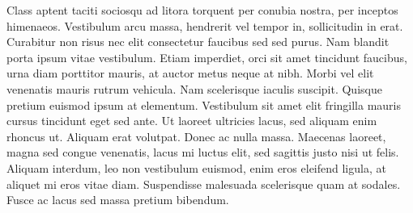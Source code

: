 Class aptent taciti sociosqu ad litora torquent per conubia nostra, per inceptos himenaeos. Vestibulum arcu massa, hendrerit vel tempor in, sollicitudin in erat. Curabitur non risus nec elit consectetur faucibus sed sed purus. Nam blandit porta ipsum vitae vestibulum. Etiam imperdiet, orci sit amet tincidunt faucibus, urna diam porttitor mauris, at auctor metus neque at nibh. Morbi vel elit venenatis mauris rutrum vehicula. Nam scelerisque iaculis suscipit. Quisque pretium euismod ipsum at elementum. Vestibulum sit amet elit fringilla mauris cursus tincidunt eget sed ante. Ut laoreet ultricies lacus, sed aliquam enim rhoncus ut. Aliquam erat volutpat. Donec ac nulla massa. Maecenas laoreet, magna sed congue venenatis, lacus mi luctus elit, sed sagittis justo nisi ut felis. Aliquam interdum, leo non vestibulum euismod, enim eros eleifend ligula, at aliquet mi eros vitae diam. Suspendisse malesuada scelerisque quam at sodales. Fusce ac lacus sed massa pretium bibendum. 